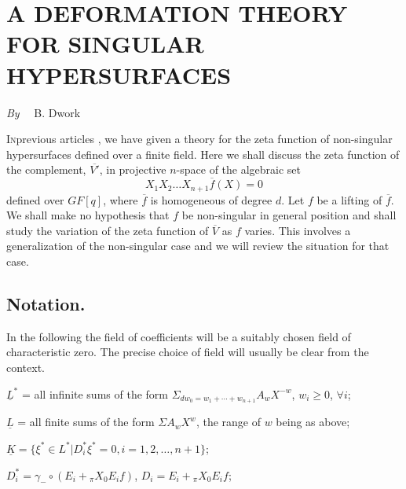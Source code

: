 \chapter[\textsc{B. Dwork~:} A Deformation Theory for Singular Hyper-surfaces]{A DEFORMATION THEORY FOR SINGULAR HYPERSURFACES}\label{art07}

\begin{center}
{\em By}~~ B. Dwork
\end{center}



\setcounter{pageoriginal}{84}
\textsc{In}\pageoriginale previous articles \cite{art07-key1}, \cite{art07-key2}
 we have given a theory for the zeta function of non-singular hypersurfaces defined over a finite field. Here we shall discuss the zeta function of the complement, $\overline{V'}$, in projective $n$-space of the algebraic set
$$
X_{1}X_{2}\ldots X_{n+1}\overline{f}(X)=0
$$
defined over $GF[q]$, where $\overline{f}$ is homogeneous of degree $d$. Let $f$ be a lifting of $\overline{f}$. We shall make no hypothesis that $f$ be non-singular in general position and shall study the variation of the zeta function of $\overline{V}$ as $f$ varies. This involves a generalization of the non-singular case and we will review the situation for that case.

\section{Notation.}\label{art07-sec1}

In the following the field of coefficients will be a suitably chosen field of characteristic zero. The precise choice of field will usually be clear from the context.

\smallskip

$\underline{L}^{*}$ = all infinite sums of the form $\Sigma_{dw_{0}=w_{1}+\cdots+w_{n+1}}A_{w}X^{-w}$, $w_{i}\geq 0$, $\forall i$;

\smallskip

$\underline{L}$ = all finite sums of the form $\Sigma A_{w}X^{w}$, the range of $w$ being as above;

\smallskip

$\underline{K}=\{\xi^{*}\in L^{*}|D^{*}_{i}\xi^{*}=0,i=1,2,\ldots,n+1\}$;

\smallskip

$D^{*}_{i}=\gamma_{-}\circ (E_{i}+{}_{\pi}X_{0}E_{i}f)$, $D_{i}=E_{i}+{}_{\pi}X_{0}E_{i}f$;

